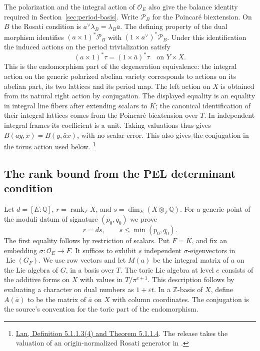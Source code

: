 The polarization and the integral action of \(\mathcal O_E\) also
give the balance identity required in Section~\ref{sec:period-basis}.
Write \(\mathcal P_B\) for the Poincaré biextension. On \(B\) the
Rosati condition is \(a^\vee\lambda_B=\lambda_B\bar a\). The
defining property of the dual morphism identifies
\((a\times1)^*\mathcal P_B\) with \((1\times a^\vee)^*\mathcal P_B\).
Under this identification the induced actions on the period
trivialization satisfy
\[
        (a\times1)^*\tau=(1\times\bar a)^*\tau
                \quad\text{on }Y\times X .
\]
This is the endomorphism part of the degeneration equivalence:
the integral action on the generic polarized abelian variety
corresponds to actions on its abelian part, its two lattices and its
period map. The left action on \(X\) is obtained from its natural
right action by conjugation. The displayed equality is an equality
in integral line fibers after extending scalars to \(K\); the
canonical identification of their integral lattices comes from the
Poincaré biextension over \(T\). In independent integral frames its
coefficient is a unit. Taking valuations thus gives
\(B(ay,x)=B(y,\bar a x)\), with no scalar error. This also gives the
conjugation in the torus action used below.
\footnote{\href{https://www.kwlan.org/articles/cpt-PEL-type-thesis-revision-dense.pdf}{Lan,
Definition 5.1.1.3(4) and Theorem 5.1.1.4}. The release takes the
valuation of an origin-normalized Rosati generator in
\href{https://github.com/ChristianKudeba/alpoge-rh-verification/blob/alpoge-source-7cbf7a0c/src/ReciprocityTheory/ReductiveGroups/ArithmeticGeometry/DiscreteValuationRings/ExistsRosatiGen.lean}{}.}

\subsection{The rank bound from the PEL determinant condition}

Let \(d=[E:\mathbb Q]\), \(r=\operatorname{rank}_{\mathbb Z}X\), and
\(s=\dim_E(X\otimes_{\mathbb Z}\mathbb Q)\). For a generic point of
the moduli datum of signature \((p_0,q_0)\) we prove
\[
   r=ds,\qquad s\le\min(p_0,q_0).
\]
The first equality follows by restriction of scalars.
Put \(F=\overline K\), and fix an embedding
\(\sigma:\mathcal O_E\to F\). It suffices to exhibit \(s\) independent
\(\sigma\)-eigenvectors in \(\operatorname{Lie}(G_F)\).
We use row vectors and let \(M(a)\) be the integral matrix of \(a\)
on the Lie algebra of \(G\), in a basis over \(T\). The toric Lie
algebra at level \(e\) consists of the additive forms on \(X\) with
values in \(T/\pi^{e+1}\). This description follows by evaluating
a character on dual numbers as \(1+\varepsilon t\). In a
\(\mathbb Z\)-basis of \(X\), define \(A(\bar a)\) to be the matrix
of \(\bar a\) on \(X\) with column coordinates. The conjugation is
the source's convention for the toric part of the endomorphism.

